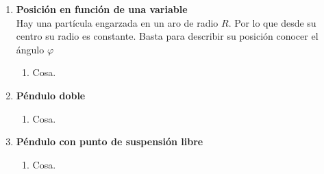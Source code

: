 \documentclass[11pt, spanish, a4paper, twoside]{article}
\begin{document}
\begin{enumerate}
\begin{minipage}[c][1cm][t]{0.4\textwidth}
		\end{minipage}


	\item
		\begin{minipage}[t][5cm]{0.5\textwidth}
			\textbf{Posición en función de una variable}\\
			Hay una partícula engarzada en un aro de radio $R$.
			Por lo que desde su centro su radio es constante.
			Basta para describir su posición conocer el ángulo $\varphi$
			\begin{enumerate}
				\item Cosa.
			\end{enumerate}
		\end{minipage}
		\begin{minipage}[c][1cm][t]{0.45\textwidth}
		\end{minipage}


	\item
		\begin{minipage}[t][5cm]{0.5\textwidth}
			\textbf{Péndulo doble}\\
			\begin{enumerate}
				\item Cosa.
			\end{enumerate}
		\end{minipage}
		\begin{minipage}[c][1cm][t]{0.45\textwidth}
		\end{minipage}
	
		\item
		\begin{minipage}[t][5cm]{0.5\textwidth}
			\textbf{Péndulo con punto de suspensión libre}\\
			\begin{enumerate}
				\item Cosa.
			\end{enumerate}
		\end{minipage}
		\begin{minipage}[c][1cm][t]{0.45\textwidth}
		\end{minipage}
	


\end{enumerate}
\end{document}
